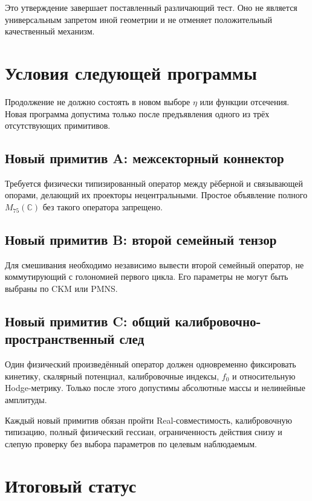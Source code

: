 Это утверждение завершает поставленный различающий тест. Оно не является
универсальным запретом иной геометрии и не отменяет положительный
качественный механизм.

\section{Условия следующей программы}

Продолжение не должно состоять в новом выборе $\eta$ или функции
отсечения. Новая программа допустима только после предъявления одного из
трёх отсутствующих примитивов.

\subsection*{Новый примитив A: межсекторный коннектор}

Требуется физически типизированный оператор между рёберной и связывающей
опорами, делающий их проекторы нецентральными. Простое объявление полного
$M_{75}(\mathbb C)$ без такого оператора запрещено.

\subsection*{Новый примитив B: второй семейный тензор}

Для смешивания необходимо независимо вывести второй семейный оператор,
не коммутирующий с голономией первого цикла. Его параметры не могут быть
выбраны по CKM или PMNS.

\subsection*{Новый примитив C: общий калибровочно-пространственный след}

Один физический произведённый оператор должен одновременно фиксировать
кинетику, скалярный потенциал, калибровочные индексы, $f_0$ и
относительную Hodge-метрику. Только после этого допустимы абсолютные массы
и нелинейные амплитуды.

Каждый новый примитив обязан пройти Real-совместимость, калибровочную
типизацию, полный физический гессиан, ограниченность действия снизу и
слепую проверку без выбора параметров по целевым наблюдаемым.

\section{Итоговый статус}

